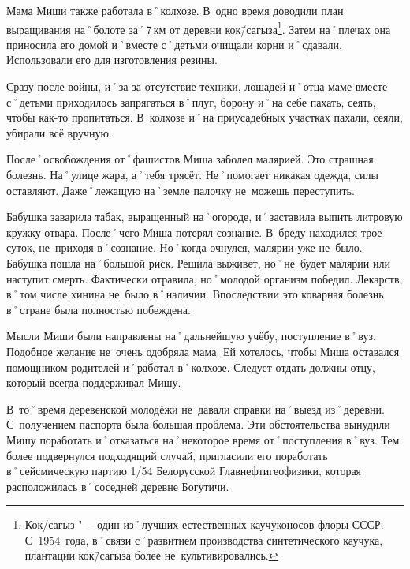 Мама Миши также работала в˚колхозе. В~одно время доводили план выращивания на˚болоте за˚7\,км от деревни кок\=/сагыза\footnote{Кок\=/сагыз "--- один из˚лучших естественных каучуконосов флоры СССР. С~1954~года, в˚связи с˚развитием производства синтетического каучука, плантации кок\=/сагыза более не~культивировались.}. Затем на˚плечах она приносила его домой и˚вместе с˚детьми очищали корни и˚сдавали. Использовали его для изготовления резины.

Сразу после войны, и˚за-за отсутствие техники, лошадей и˚отца маме вместе с˚детьми приходилось запрягаться в˚плуг, борону и˚на себе пахать, сеять, чтобы как-то пропитаться. В~колхозе и˚на приусадебных участках пахали, сеяли, убирали всё вручную.

После˚освобождения от˚фашистов Миша заболел малярией. Это страшная болезнь. На˚улице жара, а˚тебя трясёт. Не˚помогает никакая одежда, силы оставляют. Даже˚лежащую на˚земле палочку не~можешь переступить. 

Бабушка заварила табак, выращенный на˚огороде, и˚заставила выпить литровую кружку отвара. После˚чего Миша потерял сознание. В~бреду находился трое суток, не~приходя в˚сознание. Но˚когда очнулся, малярии уже не~было. Бабушка пошла на˚большой риск. Решила выживет, но˚не~будет малярии или наступит смерть. Фактически отравила, но˚молодой организм победил. Лекарств, в˚том числе хинина не~было в˚наличии. Впоследствии это коварная болезнь в˚стране была полностью побеждена.

Мысли Миши были направлены на˚дальнейшую учёбу, поступление в˚вуз. Подобное желание не~очень одобряла мама. Ей хотелось, чтобы Миша оставался помощником родителей и˚работал в˚колхозе. Следует отдать должны отцу, который всегда поддерживал Мишу. 

В~то˚время деревенской молодёжи не~давали справки на˚выезд из˚деревни. С~получением паспорта была большая проблема. Эти обстоятельства вынудили Мишу поработать и˚отказаться на˚некоторое время от˚поступления в˚вуз. Тем более подвернулся подходящий случай, пригласили его поработать в˚сейсмическую партию 1/54 Белорусской Главнефтигеофизики, которая расположилась в˚соседней деревне Богутичи.